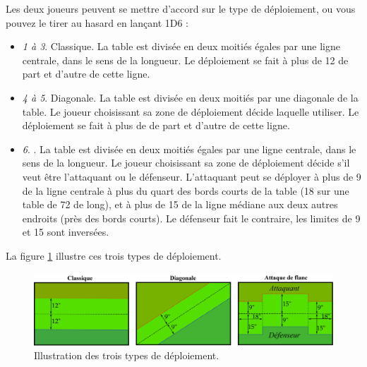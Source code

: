 Les deux joueurs peuvent se mettre d'accord sur le type de déploiement, ou vous pouvez le tirer au hasard en lançant 1D6 :
\begin{itemize}[label={-}]
\item \emph{1 à 3}. Classique. La table est divisée en deux moitiés égales par une ligne centrale, dans le sens de la longueur. Le déploiement se fait à plus de \unit{12}{\pouce} de part et d'autre de cette ligne. 
\item \emph{4 à 5}. Diagonale. La table est divisée en deux moitiés par une diagonale de la table. Le joueur choisissant sa zone de déploiement décide laquelle utiliser. Le déploiement se fait à plus de  de part et d'autre de cette ligne. 
\item \emph{6}. . La table est divisée en deux moitiés égales par une ligne centrale, dans le sens de la longueur. Le joueur choisissant sa zone de déploiement décide s'il veut être l'attaquant ou le défenseur. L'attaquant peut se déployer à plus de \unit{9}{\pouce} de la ligne centrale à plus du quart des bords courts de la table (\unit{18}{\pouce} sur une table de \unit{72}{\pouce} de long), et à plus de \unit{15}{\pouce} de la ligne médiane aux deux autres endroits (près des bords courts). Le défenseur fait le contraire, les limites de \unit{9}{\pouce} et \unit{15}{\pouce} sont inversées.
\end{itemize}

La figure \ref{figure/deploiement} illustre ces trois types de déploiement.

\begin{figure}[!htbp]
\centering

\includegraphics[width=14cm]{deploiement.png}
\caption{Illustration des trois types de déploiement.}
\label{figure/deploiement}
\end{figure}

\section[Objectifs secondaires]{}

